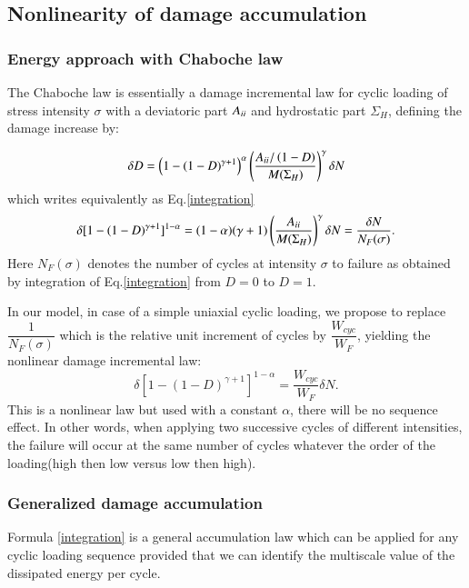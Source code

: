 \documentclass[3p,times,procedia,number]{elsarticle}
\begin{document}
\subsection{Nonlinearity of damage accumulation}
\subsubsection{Energy approach with Chaboche law}
The Chaboche law\cite{lemaitre1990mechanics} is essentially a damage incremental law for cyclic loading of stress intensity $\sigma$ with a deviatoric part ${A}_{\uppercase\expandafter{\romannumeral2}}$ and hydrostatic part $\Sigma_H$, defining the damage increase by:

\begin{equation}\delta D = \left( 1 -(1-D)^{\gamma+1}\right)^\alpha \left(\frac{{A}_{\uppercase\expandafter{\romannumeral2}}/\left( 1-D\right) }{M(\Sigma_H)}\right)^\gamma \delta N
	\label{chabochemulti}
\end{equation} 
which writes equivalently as Eq.\eqref{integration}
\begin{equation}\delta [1-(1-D)^{\gamma+1}]^{1-\alpha}=(1-\alpha)(\gamma+1)\left(\dfrac{{A}_{\uppercase\expandafter{\romannumeral2}} }{M(\Sigma_H)}\right)^\gamma \delta N=\dfrac{\delta N}{N_F(\sigma)}.
	\label{integration}
\end{equation}
Here $N_F(\sigma)$ denotes the number of cycles at intensity $\sigma$ to failure as obtained by integration of Eq.\eqref{integration} from $D=0$ to $D=1$.

In our model, in case of a simple uniaxial cyclic loading, we propose to replace $\dfrac{1}{N_F(\sigma)}$ which is the relative unit increment of cycles by $\dfrac{W_{cyc}}{W_F}$, yielding the nonlinear damage incremental law:
\begin{equation}
	\delta[1-(1-D)^{\gamma+1}]^{1-\alpha}=\dfrac{W_{cyc}}{W_F}\delta N.
	\label{integrationW}
\end{equation}
This is a nonlinear law but used with a constant $\alpha$, there will be no sequence effect. In other words,
when applying two successive cycles of different intensities, the failure will occur at the same number of cycles whatever the order of the loading(high then low versus low then high).

\subsubsection{Generalized damage accumulation}
Formula \eqref{integration} is a general accumulation law which can be applied for any cyclic loading sequence provided that we can identify the multiscale value of the dissipated energy per cycle. 
\end{document}
